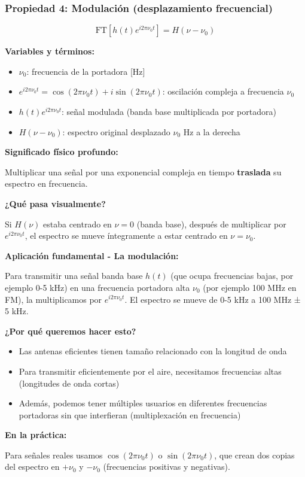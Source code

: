 \documentclass[11pt,a4paper]{article}
\begin{document}
\subsubsection{Propiedad 4: Modulación (desplazamiento frecuencial)}

\begin{tcolorbox}[colback=amarillo!40,colframe=azuloscuro,title=\textbf{BASE MATEMÁTICA DE LA MODULACIÓN}]
$$\boxed{\text{FT}[h(t)e^{i2\pi\nu_0 t}] = H(\nu-\nu_0)}$$

\textbf{Variables y términos:}
\begin{itemize}
\item $\nu_0$: frecuencia de la portadora [Hz]
\item $e^{i2\pi\nu_0 t} = \cos(2\pi\nu_0 t) + i\sin(2\pi\nu_0 t)$: oscilación compleja a frecuencia $\nu_0$
\item $h(t)e^{i2\pi\nu_0 t}$: señal modulada (banda base multiplicada por portadora)
\item $H(\nu-\nu_0)$: espectro original desplazado $\nu_0$ Hz a la derecha
\end{itemize}

\textbf{Significado físico profundo:}

Multiplicar una señal por una exponencial compleja en tiempo \textbf{traslada} su espectro en frecuencia.

\textbf{¿Qué pasa visualmente?}

Si $H(\nu)$ estaba centrado en $\nu = 0$ (banda base), después de multiplicar por $e^{i2\pi\nu_0 t}$, el espectro se mueve íntegramente a estar centrado en $\nu = \nu_0$.

\textbf{Aplicación fundamental - La modulación:}

Para transmitir una señal banda base $h(t)$ (que ocupa frecuencias bajas, por ejemplo 0-5 kHz) en una frecuencia portadora alta $\nu_0$ (por ejemplo 100 MHz en FM), la multiplicamos por $e^{i2\pi\nu_0 t}$. El espectro se mueve de 0-5 kHz a 100 MHz ± 5 kHz.

\textbf{¿Por qué queremos hacer esto?}
\begin{itemize}
\item Las antenas eficientes tienen tamaño relacionado con la longitud de onda
\item Para transmitir eficientemente por el aire, necesitamos frecuencias altas (longitudes de onda cortas)
\item Además, podemos tener múltiples usuarios en diferentes frecuencias portadoras sin que interfieran (multiplexación en frecuencia)
\end{itemize}

\textbf{En la práctica:}

Para señales reales usamos $\cos(2\pi\nu_0 t)$ o $\sin(2\pi\nu_0 t)$, que crean dos copias del espectro en $+\nu_0$ y $-\nu_0$ (frecuencias positivas y negativas).
\end{tcolorbox}
\end{document}

